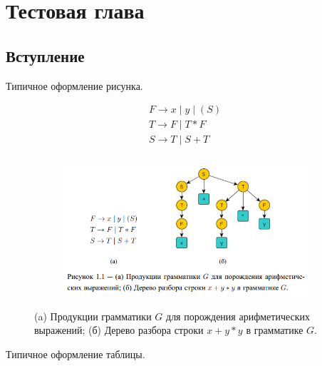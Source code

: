 \chapter{Тестовая глава}

\section{Вступление}

Типичное оформление рисунка.

\begin{figure}[ht]
    \centering
        \begin{subfigure}[b]{0.3\textwidth}    
        \centering
            $$\begin{array}{l}
            F \to x \;|\; y \;|\; (S) \\
            T \to F \;|\; T \ast F \\
            S \to T \;|\; S + T \\    
            \end{array}$$
            \caption{}
        \end{subfigure} %
        \begin{subfigure}[b]{0.6\textwidth}
        \centering
            \includegraphics[scale=0.7]{parseTree.png}
            \caption{}
        \end{subfigure}
     
        \caption{(a) Продукции грамматики $G$ для порождения арифметических выражений; 
                 (б) Дерево разбора строки $x+y\ast y$ в грамматике $G$.}
        \label{fig_parsetree}
\end{figure}

\clearpage
Типичное оформление таблицы.

